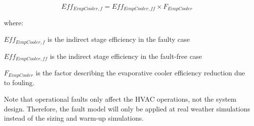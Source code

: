 \begin{equation}
Eff_{EvapCooler,f} = Eff_{EvapCooler,ff} \times F_{EvapCooler}
\end{equation}

where:

\(Eff_{EvapCooler,f}\) is the indirect stage efficiency in the faulty case

\(Eff_{EvapCooler,ff}\) is the indirect stage efficiency in the fault-free case

\(F_{EvapCooler}\) is the factor describing the evaporative cooler efficiency reduction due to fouling.

Note that operational faults only affect the HVAC operations, not the system design. Therefore, the fault model will only be applied at real weather simulations instead of the sizing and warm-up simulations.
